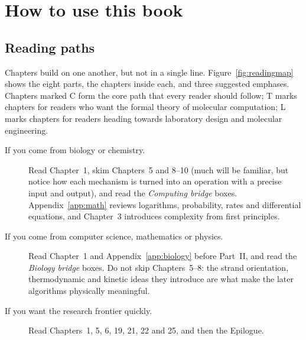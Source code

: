 \chapter*{How to use this book}

\section*{Reading paths}
Chapters build on one another, but not in a single line. Figure~\ref{fig:readingmap}
shows the eight parts, the chapters inside each, and three suggested emphases.
Chapters marked \textsf{C} form the core path that every reader should follow;
\textsf{T} marks chapters for readers who want the formal theory of molecular
computation; \textsf{L} marks chapters for readers heading towards laboratory
design and molecular engineering.


\begin{description}
\item[If you come from biology or chemistry.] Read Chapter~1, skim
Chapters~5 and 8--10 (much will be familiar, but notice how each mechanism is
turned into an operation with a precise input and output), and read the
\emph{Computing bridge} boxes. Appendix~\ref{app:math} reviews logarithms,
probability, rates and differential equations, and Chapter~3 introduces
complexity from first principles.
\item[If you come from computer science, mathematics or physics.] Read
Chapter~1 and Appendix~\ref{app:biology} before Part~II, and read the
\emph{Biology bridge} boxes. Do not skip Chapters~5--8: the strand
orientation, thermodynamic and kinetic ideas they introduce are what make the
later algorithms physically meaningful.
\item[If you want the research frontier quickly.] Read Chapters~1, 5, 6,
19, 21, 22 and 25, and then the Epilogue.
\end{description}

